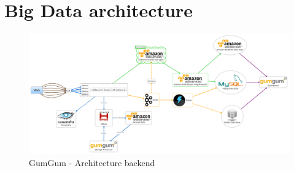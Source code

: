 \section{Big Data architecture}

\begin{figure}[!ht]
\centering
\includegraphics[width=1.0\textwidth]{img/xmind/architecture_xmind.png}
\caption{GumGum - Architecture backend}
\label{issues}
\end{figure}

\newpage